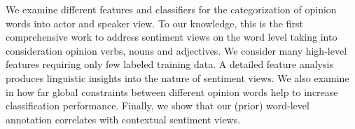 We examine different features and classifiers for the categorization of opinion words into actor and speaker view. To our knowledge, this is the first comprehensive work to address sentiment views on the word level taking into consideration opinion verbs, nouns and adjectives. We consider many high-level features requiring only few labeled training data. A detailed feature analysis produces linguistic insights into the nature of sentiment views. We also examine in how far global constraints between different opinion words help to increase classification performance. Finally, we show that our (prior) word-level annotation correlates with contextual sentiment views.
